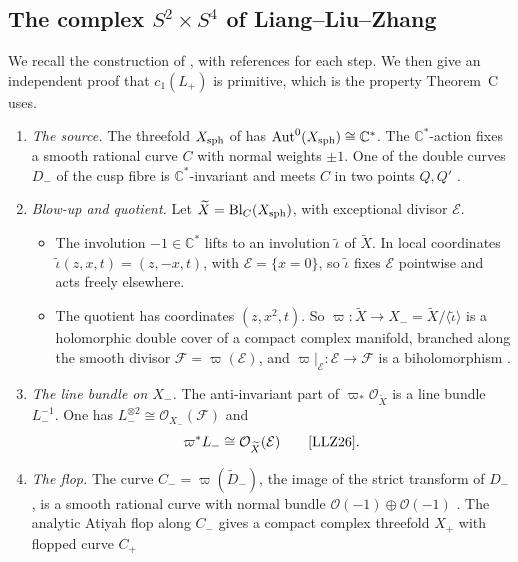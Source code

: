 \documentclass{article}
\theoremstyle{definition}
\theoremstyle{plain}
\newcommand{\C}{\mathbb{C}}
\newcommand{\cO}{\mathcal{O}}
\begin{document}
\subsection{The complex $S^2\times S^4$ of Liang--Liu--Zhang}\label{sec:LLZ}
We recall the construction of \cite{LLZ26}, with references for each step. We then give
an independent proof that $c_1(L_+)$ is primitive, which is the property Theorem~C uses.
\begin{enumerate}
\item \emph{The source.} The threefold $X_{\rm sph}$ of \cite{AC26} has
  $\mathrm{Aut}^0(X_{\rm sph})\cong\C^*$. The $\C^*$-action fixes a smooth rational curve $C$
  with normal weights $\pm1$. One of the double curves $D_-$ of the cusp fibre is
  $\C^*$-invariant and meets $C$ in two points $Q,Q'$ \cite[\S1]{LLZ26}.
\item \emph{Blow-up and quotient.} Let $\widetilde X=\mathrm{Bl}_C(X_{\rm sph})$, with
  exceptional divisor $\mathcal E$.
  \begin{itemize}
  \item The involution $-1\in\C^*$ lifts to an involution $\tilde\iota$ of $\widetilde X$.
    In local coordinates $\tilde\iota(z,x,t)=(z,-x,t)$, with $\mathcal E=\{x=0\}$, so
    $\tilde\iota$ fixes $\mathcal E$ pointwise and acts freely elsewhere.
  \item The quotient has coordinates $(z,x^2,t)$. So
    $\varpi\colon\widetilde X\to X_-=\widetilde X/\langle\tilde\iota\rangle$ is a holomorphic
    double cover of a compact complex manifold, branched along the smooth divisor
    $\mathcal F=\varpi(\mathcal E)$, and $\varpi|_{\mathcal E}\colon\mathcal E\to\mathcal F$ is a
    biholomorphism \cite[\S2.1]{LLZ26}.
  \end{itemize}
\item \emph{The line bundle on $X_-$.} The anti-invariant part of $\varpi_*\cO_{\widetilde X}$
  is a line bundle $L_-^{-1}$. One has $L_-^{\otimes2}\cong\cO_{X_-}(\mathcal F)$
  \cite[\S4.1]{LLZ26} and
  \begin{equation}\label{eq:qL}
  \varpi^*L_-\cong\cO_{\widetilde X}(\mathcal E)\qquad\text{\cite[(4)]{LLZ26}}.
  \end{equation}
\item \emph{The flop.} The curve $C_-=\varpi(\widetilde D_-)$, the image of the strict
  transform of $D_-$, is a smooth rational curve with normal bundle
  $\cO(-1)\oplus\cO(-1)$ \cite[Lemma 3.1]{LLZ26}. The analytic Atiyah flop along $C_-$
  gives a compact complex threefold $X_+$ with flopped curve $C_+$

\end{enumerate}
\end{document}
